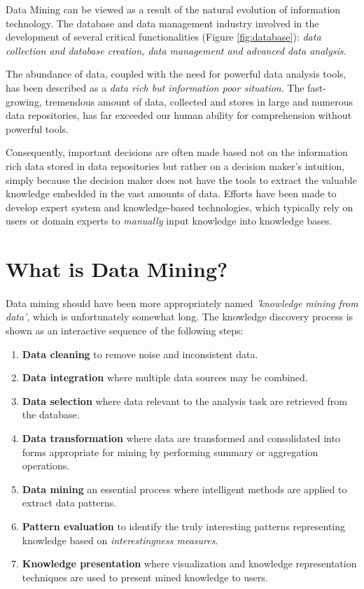 \documentclass{book}
\begin{document}
    Data Mining can be viewed as a result of the natural evolution of information technology. The database and data management industry involved in the development of several critical functionalities (Figure \ref{fig:database}): \textit{data collection and database creation, data management and advanced data analysis.}

    The abundance of data, coupled with the need for powerful data analysis tools, has been described as a \textit{data rich but information poor situation}. The fast-growing, tremendous amount of data, collected and stores in large and numerous data repositories, has far exceeded our human ability for comprehension without powerful tools. 
    
    Consequently, important decisions are often made based not on the information rich data stored in data repositories but rather on a decision maker's intuition, simply because the decision maker does not have the tools to extract the valuable knowledge embedded in the vast amounts of data. Efforts have been made to develop expert system and knowledge-based technologies, which typically rely on users or domain experts to \textit{manually} input knowledge into knowledge bases.


    \section{What is Data Mining?}
    \paragraph{}
    Data mining should have been more appropriately named \textit{'knowledge mining from data'}, which is unfortunately somewhat long. The knowledge discovery process is shown as an interactive sequence of the following steps:
    
    \begin{enumerate}
        \item \textbf{Data cleaning} to remove noise and inconsistent data.
        \item \textbf{Data integration} where multiple data sources may be combined.
        \item \textbf{Data selection} where data relevant to the analysis task are retrieved from the database.
        \item \textbf{Data transformation} where data are transformed and consolidated into forms appropriate for mining by performing summary or aggregation operations.
        \item \textbf{Data mining} an essential process where intelligent methods are applied to extract data patterns.
        \item \textbf{Pattern evaluation} to identify the truly interesting patterns representing knowledge based on \textit{interestingness measures}.
        \item \textbf{Knowledge presentation} where visualization and knowledge representation techniques are used to present mined knowledge to users. 
    \end{enumerate}
\end{document}
